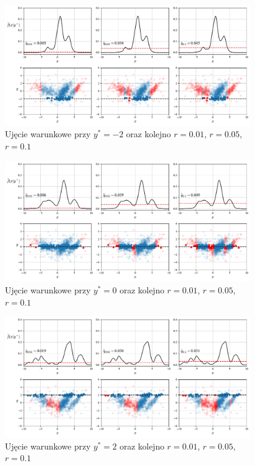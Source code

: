 \documentclass[12pt,a4paper,oneside]{book}
\theoremstyle{definition}
\begin{document}
\newpage
\begin{figure}[H]
    \centering
    \includegraphics[width=0.95\textwidth]{synthetic_data_outliers_ckde_extra1}
    \vspace{-0.5cm} 
    \caption{Ujęcie warunkowe przy $y^*=-2$ oraz kolejno $r=0.01$, $r=0.05$, $r=0.1$}
    \label{fig:synthetic_data_outliers3}
\end{figure}
\vspace{-0.5cm} 
\begin{figure}[H]
    \centering
    \includegraphics[width=0.95\textwidth]{synthetic_data_outliers_ckde_extra2}
    \vspace{-0.5cm} 
    \caption{Ujęcie warunkowe przy $y^*=0$ oraz kolejno $r=0.01$, $r=0.05$, $r=0.1$}
    \label{fig:synthetic_data_outliers4}
\end{figure}
\vspace{-0.5cm} 
\begin{figure}[H]
    \centering
    \includegraphics[width=0.95\textwidth]{synthetic_data_outliers_ckde_extra3}
    \vspace{-0.5cm} 
    \caption{Ujęcie warunkowe przy $y^*=2$ oraz kolejno $r=0.01$, $r=0.05$, $r=0.1$}
    \label{fig:synthetic_data_outliers5}
\end{figure}
\end{document}

